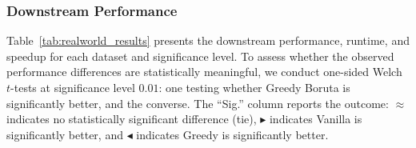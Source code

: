 \documentclass[runningheads]{llncs}
\begin{document}
\subsubsection{Downstream Performance}
\label{sec:experiments:realworld:performance}
 
Table~\ref{tab:realworld_results} presents the downstream performance, runtime, and
speedup for each dataset and significance level.
To assess whether the observed performance differences are statistically meaningful,
we conduct one-sided Welch $t$-tests at significance level $0.01$: one testing
whether Greedy Boruta is significantly better, and the converse.
The ``Sig.'' column reports the outcome: $\approx$ indicates no statistically
significant difference (tie), $\blacktriangleright$ indicates Vanilla is significantly
better, and $\blacktriangleleft$ indicates Greedy is significantly better.
 
\end{document}
